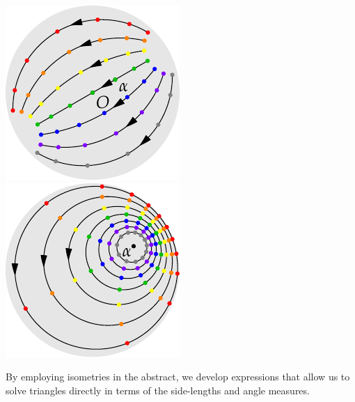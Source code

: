 \begin{minipage}[t]{0.24\linewidth}\vspace{-3pt}
	\flushright\includegraphics[scale=0.95]{isom-trans}\\
	\includegraphics[scale=0.95]{isom-rotate}
\end{minipage}

\goodbreak




By employing isometries in the abstract, we develop expressions that allow us to solve triangles directly in terms of the side-lengths and angle measures.


\smallbreak

